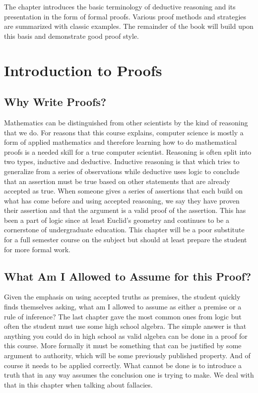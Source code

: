 \documentclass[11pt]{book} %
\theoremstyle {definition}
\theoremstyle {remark}
\begin{document}
The chapter introduces the basic terminology of deductive reasoning and its presentation in the form of formal proofs. Various proof methods and strategies are summarized with classic examples. The remainder of the book will build upon this basis and demonstrate good proof style.

\section {Introduction to Proofs}
  \subsection {Why Write Proofs?}
Mathematics can be distinguished from other scientists by the kind of reasoning that we do. For reasons that this course explains, computer science is mostly a form of applied mathematics and therefore learning how to do mathematical proofs is a needed skill for a true computer scientist. Reasoning is often split into two types, inductive and deductive. Inductive reasoning is that which tries to generalize from a series of observations while deductive uses logic to conclude that an assertion must be true based on other statements that are already accepted as true. When someone gives a series of assertions that each build on what has come before and using accepted reasoning, we say they have proven their assertion and that the argument is a valid proof of the assertion. This has been a part of logic since at least Euclid's geometry and continues to be a cornerstone of undergraduate education. This chapter will be a poor substitute for a full semester course on the subject but should at least prepare the student for more formal work.

  \subsection{What Am I Allowed to Assume for this Proof?}
Given the emphasis on using accepted truths as premises, the student quickly finds themselves asking, what am I allowed to assume as either a premise or a rule of inference? The last chapter gave the most common ones from logic but often the student must use some high school algebra. The simple answer is that anything you could do in high school as valid algebra can be done in a proof for this course. More formally it must be something that can be justified by some argument to authority, which will be some previously published property. And of course it needs to be applied correctly. What cannot be done is to introduce a truth that in any way assumes the conclusion one is trying to make. We deal with that in this chapter when talking about fallacies.
\end{document}
